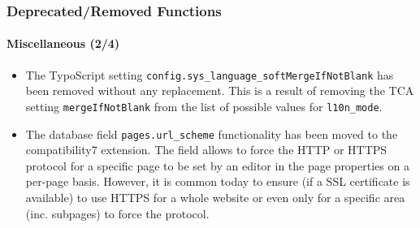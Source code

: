\begin{frame}[fragile]
	\frametitle{Deprecated/Removed Functions}
	\framesubtitle{Miscellaneous (2/4)}


	\begin{itemize}
		\item The TypoScript setting \texttt{config.sys\_language\_softMergeIfNotBlank}
			has been removed without any replacement. This is a result of removing the
			TCA setting \texttt{mergeIfNotBlank} from the list of possible values for \texttt{l10n\_mode}.

		\item The database field \texttt{pages.url\_scheme} functionality has been moved
			to the compatibility7 extension. The field allows to force the HTTP or HTTPS
			protocol for a specific page to be set by an editor in the page properties on
			a per-page basis. However, it is common today to ensure (if a SSL certificate
			is available) to use HTTPS for a whole website or even only for a specific area
			(inc. subpages) to force the protocol.

	\end{itemize}

\end{frame}


